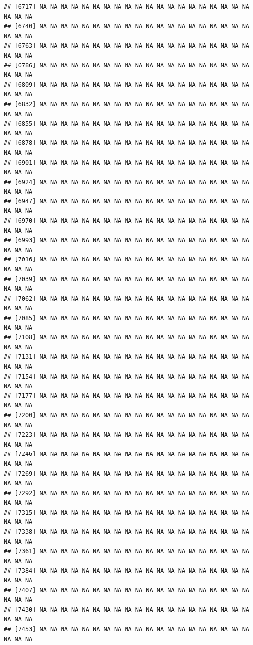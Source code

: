 \documentclass{article}\usepackage[]{graphicx}\usepackage[]{color}
\makeatletter
\newenvironment{kframe}{%
 \def\at@end@of@kframe{}%
 \ifinner\ifhmode%
  \def\at@end@of@kframe{\end{minipage}}%
  \begin{minipage}{\columnwidth}%
 \fi\fi%
 \def\FrameCommand##1{\hskip\@totalleftmargin \hskip-\fboxsep
 \colorbox{shadecolor}{##1}\hskip-\fboxsep
     \hskip-\linewidth \hskip-\@totalleftmargin \hskip\columnwidth}%
 \MakeFramed {\advance\hsize-\width
   \@totalleftmargin\z@ \linewidth\hsize
   \@setminipage}}%
 {\par\unskip\endMakeFramed%
 \at@end@of@kframe}
\newenvironment{knitrout}{}{} %
\makeatother
\begin{document}
\begin{knitrout}
\begin{kframe}
\begin{verbatim}
## [6717] NA NA NA NA NA NA NA NA NA NA NA NA NA NA NA NA NA NA NA NA NA NA NA
## [6740] NA NA NA NA NA NA NA NA NA NA NA NA NA NA NA NA NA NA NA NA NA NA NA
## [6763] NA NA NA NA NA NA NA NA NA NA NA NA NA NA NA NA NA NA NA NA NA NA NA
## [6786] NA NA NA NA NA NA NA NA NA NA NA NA NA NA NA NA NA NA NA NA NA NA NA
## [6809] NA NA NA NA NA NA NA NA NA NA NA NA NA NA NA NA NA NA NA NA NA NA NA
## [6832] NA NA NA NA NA NA NA NA NA NA NA NA NA NA NA NA NA NA NA NA NA NA NA
## [6855] NA NA NA NA NA NA NA NA NA NA NA NA NA NA NA NA NA NA NA NA NA NA NA
## [6878] NA NA NA NA NA NA NA NA NA NA NA NA NA NA NA NA NA NA NA NA NA NA NA
## [6901] NA NA NA NA NA NA NA NA NA NA NA NA NA NA NA NA NA NA NA NA NA NA NA
## [6924] NA NA NA NA NA NA NA NA NA NA NA NA NA NA NA NA NA NA NA NA NA NA NA
## [6947] NA NA NA NA NA NA NA NA NA NA NA NA NA NA NA NA NA NA NA NA NA NA NA
## [6970] NA NA NA NA NA NA NA NA NA NA NA NA NA NA NA NA NA NA NA NA NA NA NA
## [6993] NA NA NA NA NA NA NA NA NA NA NA NA NA NA NA NA NA NA NA NA NA NA NA
## [7016] NA NA NA NA NA NA NA NA NA NA NA NA NA NA NA NA NA NA NA NA NA NA NA
## [7039] NA NA NA NA NA NA NA NA NA NA NA NA NA NA NA NA NA NA NA NA NA NA NA
## [7062] NA NA NA NA NA NA NA NA NA NA NA NA NA NA NA NA NA NA NA NA NA NA NA
## [7085] NA NA NA NA NA NA NA NA NA NA NA NA NA NA NA NA NA NA NA NA NA NA NA
## [7108] NA NA NA NA NA NA NA NA NA NA NA NA NA NA NA NA NA NA NA NA NA NA NA
## [7131] NA NA NA NA NA NA NA NA NA NA NA NA NA NA NA NA NA NA NA NA NA NA NA
## [7154] NA NA NA NA NA NA NA NA NA NA NA NA NA NA NA NA NA NA NA NA NA NA NA
## [7177] NA NA NA NA NA NA NA NA NA NA NA NA NA NA NA NA NA NA NA NA NA NA NA
## [7200] NA NA NA NA NA NA NA NA NA NA NA NA NA NA NA NA NA NA NA NA NA NA NA
## [7223] NA NA NA NA NA NA NA NA NA NA NA NA NA NA NA NA NA NA NA NA NA NA NA
## [7246] NA NA NA NA NA NA NA NA NA NA NA NA NA NA NA NA NA NA NA NA NA NA NA
## [7269] NA NA NA NA NA NA NA NA NA NA NA NA NA NA NA NA NA NA NA NA NA NA NA
## [7292] NA NA NA NA NA NA NA NA NA NA NA NA NA NA NA NA NA NA NA NA NA NA NA
## [7315] NA NA NA NA NA NA NA NA NA NA NA NA NA NA NA NA NA NA NA NA NA NA NA
## [7338] NA NA NA NA NA NA NA NA NA NA NA NA NA NA NA NA NA NA NA NA NA NA NA
## [7361] NA NA NA NA NA NA NA NA NA NA NA NA NA NA NA NA NA NA NA NA NA NA NA
## [7384] NA NA NA NA NA NA NA NA NA NA NA NA NA NA NA NA NA NA NA NA NA NA NA
## [7407] NA NA NA NA NA NA NA NA NA NA NA NA NA NA NA NA NA NA NA NA NA NA NA
## [7430] NA NA NA NA NA NA NA NA NA NA NA NA NA NA NA NA NA NA NA NA NA NA NA
## [7453] NA NA NA NA NA NA NA NA NA NA NA NA NA NA NA NA NA NA NA NA NA NA NA

\end{verbatim}
\end{kframe}
\end{knitrout}
\end{document}
